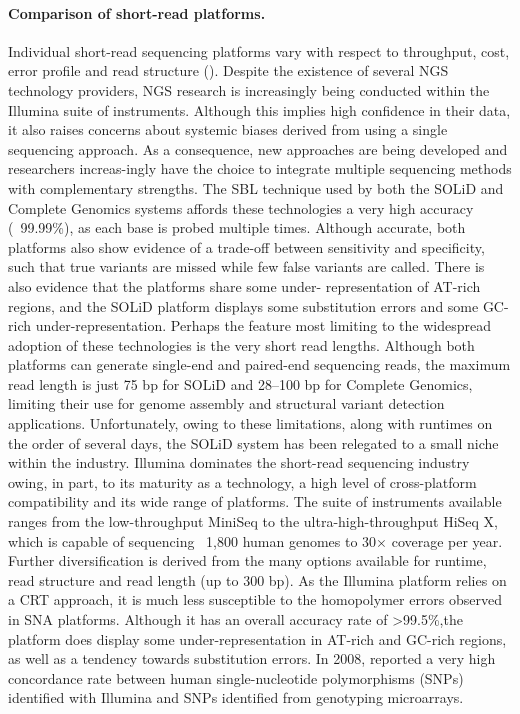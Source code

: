 \paragraph{Comparison of short-read platforms.}
Individual short-read sequencing platforms vary with respect to throughput, cost, error profile and read structure (). 
Despite the existence of several NGS technology providers, NGS research is increasingly being conducted within the Illumina suite of instruments. Although 
this implies high confidence in their data, it also raises concerns about systemic biases derived from using a single sequencing approach. As a consequence, new 
approaches are being developed and researchers increas-ingly have the choice to integrate multiple sequencing methods with complementary strengths.
The SBL technique used by both the SOLiD and Complete Genomics systems affords these technologies a very high accuracy (~99.99\%)\citep{liu2012comparison, drmanac2010human}, as each base is probed 
multiple times. Although accurate, both platforms also show evidence of a trade-off between sensitivity and specificity, such that true variants are missed while 
few false variants are called. There is also evidence that the platforms share some under- representation of AT-rich regions, and the SOLiD platform displays 
some substitution errors and some GC-rich under-representation. Perhaps the feature most limiting to the widespread adoption of these technologies is the very 
short read lengths. Although both platforms can generate single-end and paired-end sequencing reads, the maximum read length is just 75 bp for SOLiD and 28–100 bp for Complete Genomics, limiting their use for genome 
assembly and structural variant detection applications. Unfortunately, owing to these limitations, along with runtimes on the order of several days, the SOLiD system has been relegated to a small niche within the industry. 
Illumina  dominates  the  short-read  sequencing industry owing, in part, to its maturity as a technology, a high level of cross-platform compatibility and 
its wide range of platforms. The suite of instruments available ranges from the low-throughput MiniSeq to the ultra-high-throughput HiSeq X, which is capable 
of sequencing ~1,800 human genomes to 30$\times$ coverage per year. Further diversification is derived from the many options available for runtime, read structure and 
read length (up to 300 bp). As the Illumina platform relies on a CRT approach, it is much less susceptible to the homopolymer errors observed in SNA platforms. 
Although it has an overall accuracy rate of >99.5\%,the platform does display some under-representation in AT-rich and GC-rich regions, as well as a tendency towards substitution errors. In 2008, \cite{bentley2008accurate} reported a very high concordance rate between human  single-nucleotide  polymorphisms  (SNPs)  identified with Illumina and SNPs identified from genotyping  microarrays. 

